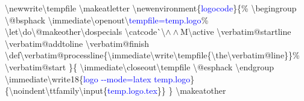 \resetlinenumber
\begin{linenumbers}\singlespacing\ttfamily
\textbackslash newwrite\textbackslash tempf{}ile\newline
\textbackslash makeatletter\newline
\textbackslash newenvironment\{\textcolor{blue}{logocode}\}\{\%\newline
\hspace*{1.2em}\textbackslash begingroup\newline
\hspace*{1.2em}\textbackslash @bsphack\newline
\hspace*{1.2em}\textbackslash immediate\textbackslash openout\textbackslash \textcolor{blue}{tempf{}ile=temp.logo}\%\newline
\hspace*{1.2em}\textbackslash let\textbackslash do\textbackslash @makeother\textbackslash dospecials\newline
\hspace*{1.2em}\textbackslash catcode\`{}\textbackslash$\wedge\wedge$M\textbackslash active\newline
\hspace*{1.2em}\textbackslash verbatim@startline\newline
\hspace*{1.2em}\textbackslash verbatim@addtoline\newline
\hspace*{1.2em}\textbackslash verbatim@f{}inish\newline
\hspace*{1.2em}\textbackslash def\textbackslash verbatim@processline\{\textbackslash immediate\textbackslash write\textbackslash tempf{}ile\{\textbackslash the\textbackslash verbatim@line\}\}\%\newline
\hspace*{1.2em}\textbackslash verbatim@start\newline
\}\{\newline
\hspace*{1.2em}\textbackslash immediate\textbackslash closeout\textbackslash tempf{}ile\newline
\hspace*{1.2em}\textbackslash @esphack\newline
\hspace*{1.2em}\textbackslash endgroup\newline
\hspace*{1.2em}\textbackslash immediate\textbackslash write18\{\textcolor{blue}{logo -{}-mode=latex temp.logo}\}\newline
\hspace*{1.2em}\{\textbackslash noindent\textbackslash ttfamily\textbackslash input\{\textcolor{blue}{temp.logo.tex}\}\}\newline
\}\newline
\textbackslash makeatother
\end{linenumbers}

